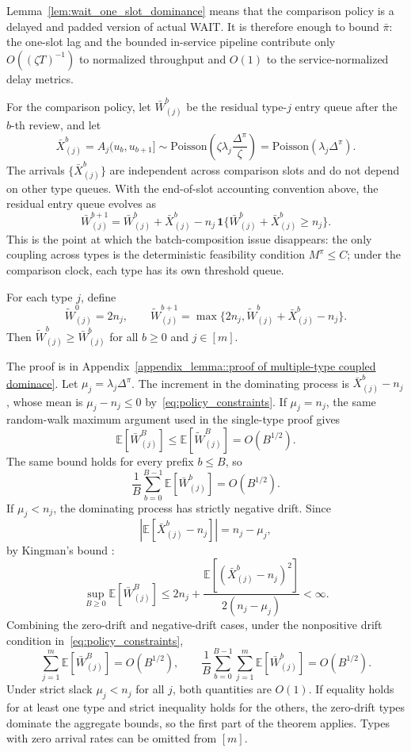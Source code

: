 Lemma~\ref{lem:wait_one_slot_dominance} means that the comparison policy is a delayed and padded version of actual WAIT. It is therefore enough to bound \(\bar\pi\): the one-slot lag and the bounded in-service pipeline contribute only \(O((\zeta T)^{-1})\) to normalized throughput and \(O(1)\) to the service-normalized delay metrics.

For the comparison policy, let \(\bar W^b_{(j)}\) be the residual type-\(j\) entry queue after the \(b\)-th review, and let
\[
    \bar X^b_{(j)}
    =A_j(u_b,u_{b+1}]
    \sim \text{Poisson}\!\left(\zeta\lambda_j\frac{\Delta^\pi}{\zeta}\right)
    =\text{Poisson}(\lambda_j\Delta^\pi).
\]
The arrivals \(\{\bar X^b_{(j)}\}\) are independent across comparison slots and do not depend on other type queues. With the end-of-slot accounting convention above, the residual entry queue evolves as
\[
    \bar W^{b+1}_{(j)}
    =
    \bar W^b_{(j)}+\bar X^b_{(j)}
    -
    n_j\,\mathbf{1}\{\bar W^b_{(j)}+\bar X^b_{(j)}\ge n_j\}.
\]
This is the point at which the batch-composition issue disappears: the only coupling across types is the deterministic feasibility condition \(M^\pi\le C\); under the comparison clock, each type has its own threshold queue.

\begin{lemma}\label{lemma::multiple-type coupled dominace}
For each type \(j\), define
\[
\widetilde W_{(j)}^0=2n_j,\qquad
\widetilde W_{(j)}^{b+1}
=\max\{2n_j,\widetilde W_{(j)}^b+\bar X^b_{(j)}-n_j\}.
\]
Then \(\widetilde W^b_{(j)}\ge \bar W^b_{(j)}\) for all \(b\ge0\) and \(j\in[m]\).
\end{lemma}
\noindent The proof is in Appendix~\ref{appendix_lemma::proof of multiple-type coupled dominace}. Let \(\mu_j=\lambda_j\Delta^\pi\). The increment in the dominating process is \(\bar X^b_{(j)}-n_j\), whose mean is \(\mu_j-n_j\le0\) by~\eqref{eq:policy_constraints}. If \(\mu_j=n_j\), the same random-walk maximum argument used in the single-type proof gives
\[
    \mathbb{E}[\bar W^B_{(j)}]
    \le \mathbb{E}[\widetilde W^B_{(j)}]
    =O(B^{1/2}).
\]
The same bound holds for every prefix \(b\le B\), so
\[
    \frac{1}{B}\sum_{b=0}^{B-1}\mathbb{E}[\bar W^b_{(j)}]=O(B^{1/2}).
\]
If \(\mu_j<n_j\), the dominating process has strictly negative drift. Since
\[
\left|\mathbb{E}[\bar X^b_{(j)}-n_j]\right|=n_j-\mu_j,
\]
by Kingman's bound \citep{kingman1962queues}:
\[
    \sup_{B\ge0}\mathbb{E}[\bar W^B_{(j)}]
    \le
    2n_j+
    \frac{\mathbb{E}[(\bar X^b_{(j)}-n_j)^2]}{2(n_j-\mu_j)}
    <\infty .
\]
Combining the zero-drift and negative-drift cases, under the nonpositive drift condition in~\eqref{eq:policy_constraints},
\[
    \sum_{j=1}^m \mathbb{E}[\bar W^B_{(j)}]=O(B^{1/2}),
    \qquad
    \frac{1}{B}\sum_{b=0}^{B-1}\sum_{j=1}^m \mathbb{E}[\bar W^b_{(j)}]=O(B^{1/2}).
\]
Under strict slack \(\mu_j<n_j\) for all \(j\), both quantities are \(O(1)\). If equality holds for at least one type and strict inequality holds for the others, the zero-drift types dominate the aggregate bounds, so the first part of the theorem applies. Types with zero arrival rates can be omitted from \([m]\).

